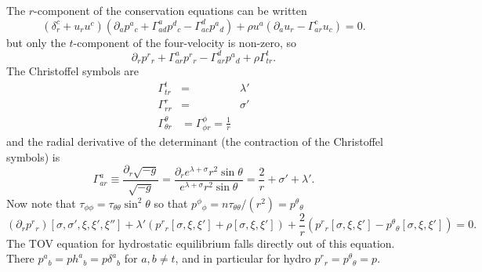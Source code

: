 The $r$-component of the conservation equations can be written
\begin{equation}
\left(\delta_r^c + u_ru^c\right) \left(\partial_a p^a{}_c +
\Gamma^a_{ad}p^d{}_c - \Gamma^d_{ac}p^a{}_d\right) + \rho u^a
\left(\partial_a u_r - \Gamma^c_{ar}u_c\right) = 0.
\end{equation}
but only the $t$-component of the four-velocity is non-zero, so
\begin{equation}
\partial_r p^r{}_r +
\Gamma^a_{ar}p^r{}_r - \Gamma^d_{ar}p^a{}_d + \rho
\Gamma^t_{tr}.
\end{equation}
The Christoffel symbols are
\begin{eqnarray}
\Gamma^t_{tr} & = & \lambda' \\
\Gamma^r_{rr} & = & \sigma' \\
\Gamma^\theta_{\theta r} & = \Gamma^\phi_{\phi r} = \frac{1}{r}
\end{eqnarray}
and the radial derivative of the determinant (the contraction of the Christoffel symbols) is
\begin{equation}
\Gamma^a_{ar} \equiv \frac{\partial_r \sqrt{-g}}{\sqrt{-g}} =
\frac{\partial_r e^{\lambda+\sigma}r^2\sin
\theta}{e^{\lambda+\sigma}r^2\sin \theta} = \frac{2}{r} + \sigma' + \lambda'.
\end{equation}
Now note that $\tau_{\phi\phi} = \tau_{\theta\theta}\sin^2\theta$ so
that $p^\phi{}_\phi = n\tau_{\theta\theta}/(r^2) = p^\theta{}_\theta$
\begin{equation}
(\partial_r p^r{}_r)[\sigma,\sigma',\xi,\xi',\xi''] + \lambda'
\left( p^r{}_r[\sigma,\xi,\xi'] + \rho[\sigma,\xi,\xi']\right)
+\frac{2}{r}\left(p^r{}_r[\sigma,\xi,\xi'] -
p^\theta{}_\theta[\sigma,\xi,\xi']\right) = 0.
\end{equation}
The TOV equation for hydrostatic equilibrium falls directly out of this
equation. There $p^a{}_b = ph^a{}_b = p\delta^a{}_b$ for $a,b\neq t$, and
in particular for hydro $p^r{}_r = p^\theta{}_\theta =p$.

